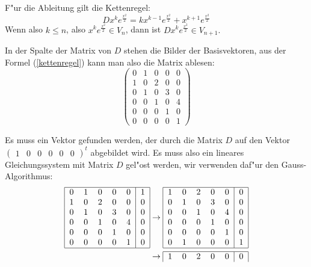 \begin{loesung}
\begin{teilaufgaben}
\item F"ur die Ableitung gilt die Kettenregel:
\begin{equation}
Dx^ke^{\frac{x^2}2}=kx^{k-1}e^{\frac{x^2}2}+x^{k+1}e^{\frac{x^2}2}
\label{kettenregel}
\end{equation}
Wenn also $k\le n$, also $x^ke^{\frac{x^2}2}\in V_n$, dann ist
$Dx^ke^{\frac{x^2}2}\in V_{n+1}.$
\item
In der Spalte der Matrix von $D$ stehen die Bilder der Basisvektoren,
aus der Formel (\ref{kettenregel}) kann man also die Matrix ablesen:
\[
\begin{pmatrix}
0&1&0&0&0\\
1&0&2&0&0\\
0&1&0&3&0\\
0&0&1&0&4\\
0&0&0&1&0\\
0&0&0&0&1
\end{pmatrix}
\]
\item
Es muss ein Vektor gefunden werden, der durch die Matrix $D$ auf
den Vektor $\begin{pmatrix}1&0&0&0&0&0\end{pmatrix}^t$
abgebildet wird. Es muss also ein lineares Gleichungssystem mit
Matrix $D$ gel"ost werden, wir verwenden daf"ur den Gauss-Algorithmus:
\begin{align*}
\begin{tabular}{|ccccc|c|}
\hline
0&1&0&0&0&1\\
1&0&2&0&0&0\\
0&1&0&3&0&0\\
0&0&1&0&4&0\\
0&0&0&1&0&0\\
0&0&0&0&1&0\\
\hline
\end{tabular}
&\rightarrow
\begin{tabular}{|ccccc|c|}
\hline
1&0&2&0&0&0\\
0&1&0&3&0&0\\
0&0&1&0&4&0\\
0&0&0&1&0&0\\
0&0&0&0&1&0\\
0&1&0&0&0&1\\
\hline
\end{tabular}
\\
&\rightarrow
\begin{tabular}{|ccccc|c|}
\hline
1&0&2&0&0&0\\

\end{tabular}
\end{align*}
\end{teilaufgaben}
\end{loesung}
